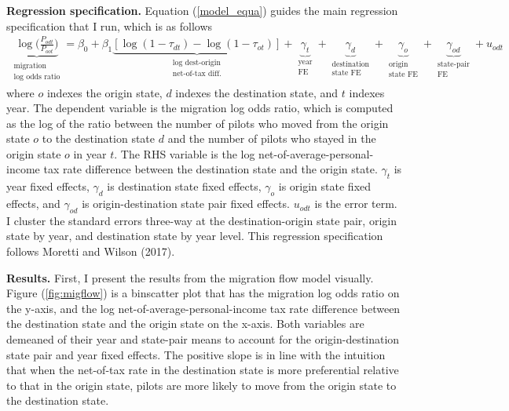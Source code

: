 \documentclass[11pt]{article}
\begin{document}
\textbf{Regression specification.} Equation (\ref{model_equa}) guides the main regression specification that I run, which is as follows
\begin{align} \label{migflow_spec}
	 \underbrace{\log \Big(\frac{P_{odt}}{P_{oot}}\Big)}_{\substack{\text{migration}\\\text{log odds ratio}}}
	 = \beta_0 + \beta_1 \underbrace{[\log(1 - \tau_{dt}) - \log(1 - \tau_{ot})]}_{\substack{\text{log dest-origin}\\\text{net-of-tax diff.}}}
	+ \underbrace{\gamma_t}_{\substack{\text{year}\\\text{FE}}}
	+ \underbrace{\gamma_d}_{\substack{\text{destination}\\\text{state FE}}}
	+ \underbrace{\gamma_o}_{\substack{\text{origin}\\\text{state FE}}}
	+ \underbrace{\gamma_{od}}_{\substack{\text{state-pair}\\\text{FE}}}
	+ u_{odt}
\end{align}
where $o$ indexes the origin state, $d$ indexes the destination state, and $t$ indexes year. The dependent variable is the migration log odds ratio, which is computed as the log of the ratio between the number of pilots who moved from the origin state $o$ to the destination state $d$ and the number of pilots who stayed in the origin state $o$ in year $t$. The RHS variable is the log net-of-average-personal-income tax rate difference between the destination state and the origin state. $\gamma_t$ is year fixed effects, $\gamma_d$ is destination state fixed effects,  $\gamma_o$ is origin state fixed effects, and $\gamma_{od}$ is origin-destination state pair fixed effects. $u_{odt}$ is the error term. I cluster the standard errors three-way at the destination-origin state pair, origin state by year, and destination state by year level. This regression specification follows Moretti and Wilson (2017). 

\textbf{Results.} First, I present the results from the migration flow model visually. Figure (\ref{fig:migflow}) is a binscatter plot that has the migration log odds ratio on the y-axis, and the log net-of-average-personal-income tax rate difference between the destination state and the origin state on the x-axis. Both variables are demeaned of their year and state-pair means to account for the origin-destination state pair and year fixed effects. The positive slope is in line with the intuition that when the net-of-tax rate in the destination state is more preferential relative to that in the origin state, pilots are more likely to move from the origin state to the destination state.
\end{document}
